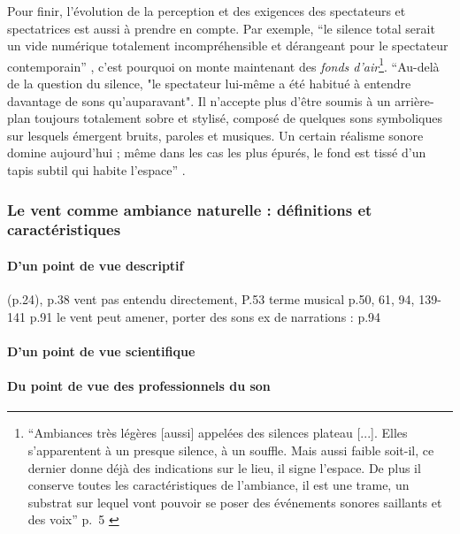 ﻿\documentclass[12pt]{article}
\begin{document}
Pour finir, l'évolution de la perception et des exigences des spectateurs et spectatrices est aussi à prendre en compte.  Par exemple, \enquote{le silence total serait un vide numérique totalement incompréhensible et dérangeant pour le spectateur contemporain} \parencite{adjiman_usages_2018}, c'est pourquoi on monte maintenant des \textit{fonds d'air}\footnote{\enquote{Ambiances très légères [aussi] appelées des silences plateau [...]. Elles s'apparentent à un presque silence, à un souffle. Mais aussi faible soit-il, ce dernier donne déjà des indications sur le lieu, il signe l'espace. De plus il conserve toutes les caractéristiques de l'ambiance, il est une trame, un substrat sur lequel vont pouvoir se poser des événements sonores saillants et des voix} {p.~5} \parencite{adjiman_semiotique_2015}}. \enquote{Au-delà de la question du silence, "le spectateur lui-même a été habitué à entendre davantage de sons qu'auparavant". Il n'accepte plus d'être soumis à un arrière-plan toujours totalement sobre et stylisé, composé de quelques sons symboliques sur lesquels émergent bruits, paroles et musiques. Un certain réalisme sonore domine aujourd'hui ; même dans les cas les plus épurés, le fond est tissé d'un tapis subtil qui habite l'espace} \parencite{adjiman_usages_2018}.

\subsubsection{Le vent comme ambiance naturelle : définitions et caractéristiques}

\paragraph{D’un point de vue descriptif}
 
\parencite{gaver_what_1993} (p.24), 
\parencite{krause_wild_2002} p.38 vent pas entendu directement, P.53 terme musical  p.50, 61, 94, 139-141
\parencite{chattopadhyay_auditory_2021} p.91 le vent peut amener, porter des sons 
\parencite{chattopadhyay_auditory_2021} ex de narrations : p.94

\paragraph{D’un point de vue scientifique}

\paragraph{Du point de vue des professionnels du son}
\end{document}
